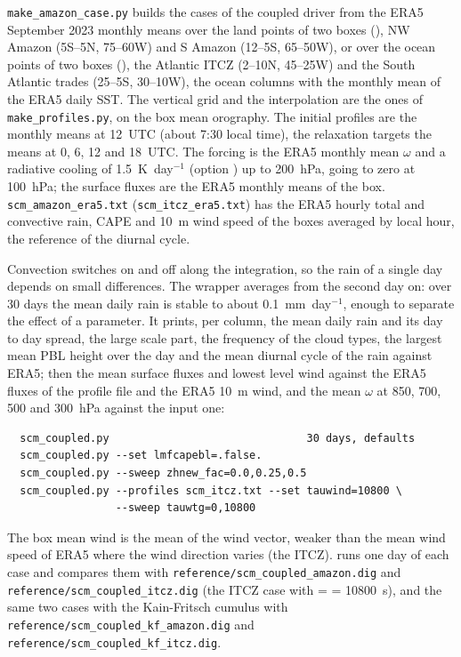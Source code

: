 \verb=make_amazon_case.py= builds the cases of the coupled driver from
the ERA5 September 2023 monthly means over the land points of two boxes
(), NW Amazon (5\textdegree S--5\textdegree N,
75--60\textdegree W) and S Amazon (12--5\textdegree S,
65--50\textdegree W), or over the ocean points of two boxes
(), the Atlantic ITCZ (2--10\textdegree N,
45--25\textdegree W) and the South Atlantic trades (25--5\textdegree S,
30--10\textdegree W), the ocean columns with the monthly mean of the
ERA5 daily SST. The vertical grid and
the interpolation are the ones of \verb=make_profiles.py=, on the box mean
orography. The initial profiles are the monthly means at 12~UTC (about
7:30 local time), the relaxation targets the means at 0, 6, 12 and
18~UTC. The forcing is the ERA5 monthly mean $\omega$ and a radiative
cooling of 1.5~K~day$^{-1}$ (option ) up to 200~hPa, going to
zero at 100~hPa; the surface fluxes are the ERA5 monthly means of the box.
\verb=scm_amazon_era5.txt= (\verb=scm_itcz_era5.txt=) has the ERA5
hourly total and convective rain, CAPE and 10~m wind speed of the boxes
averaged by local hour, the reference of the diurnal cycle.

Convection switches on and off along the integration, so the rain of a
single day depends on small differences. The wrapper averages from the
second day on: over 30 days the mean daily rain is stable to about
0.1~mm~day$^{-1}$, enough to separate the effect of a parameter. It
prints, per column, the mean daily rain and its day to day spread, the
large scale part, the frequency of the cloud types, the largest mean PBL
height over the day and the mean diurnal cycle of the rain against ERA5;
then the mean surface fluxes and lowest level wind against the ERA5
fluxes of the profile file and the ERA5 10~m wind, and the mean
$\omega$ at 850, 700, 500 and 300~hPa against the input one:
\begin{verbatim}
  scm_coupled.py                               30 days, defaults
  scm_coupled.py --set lmfcapebl=.false.
  scm_coupled.py --sweep zhnew_fac=0.0,0.25,0.5
  scm_coupled.py --profiles scm_itcz.txt --set tauwind=10800 \
                 --sweep tauwtg=0,10800
\end{verbatim}
The box mean wind is the mean of the wind vector, weaker than the mean
wind speed of ERA5 where the wind direction varies (the ITCZ).
 runs one day of each case and compares them with
\verb=reference/scm_coupled_amazon.dig= and
\verb=reference/scm_coupled_itcz.dig= (the ITCZ case with
 =  = 10800~s), and the same two cases with
the Kain-Fritsch cumulus with \verb=reference/scm_coupled_kf_amazon.dig=
and \verb=reference/scm_coupled_kf_itcz.dig=.


